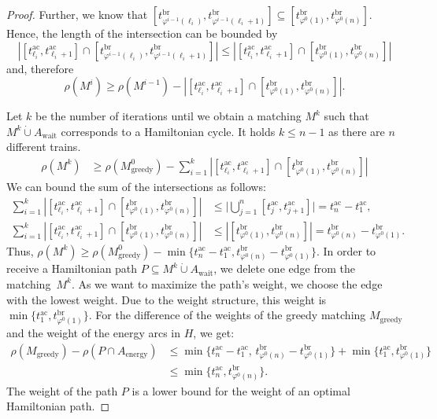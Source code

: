 \documentclass[11pt,a4paper]{article}
\newcommand{\dotcup}{\mathbin{\dot\cup}}
\newcommand{\wait}{\mathrm{wait}}
\newcommand{\energy}{\mathrm{energy}}
\newcommand{\energyact}{M}               %
\newcommand{\ac}{\mathrm{ac}}
\newcommand{\br}{\mathrm{br}}
\newcommand{\w}{\rho} %
\theoremstyle{definition}
\theoremstyle{remark}
\begin{document}
\begin{proof}
	Further, we know that $[t^{\br}_{\varphi^{i-1}(\ell_i)}, t^{\br}_{\varphi^{i-1}(\ell_i+1)} ] \subseteq [t^{\br}_{\varphi^{0}(1)}, t^{\br}_{\varphi^{0}(n)} ]$.
	Hence, the length of the intersection can be bounded by \[| [t^{\ac}_{\ell_i}, t^{\ac}_{\ell_i+1} ] \cap [t^{\br}_{\varphi^{i-1}(\ell_i)}, t^{\br}_{\varphi^{i-1}(\ell_i+1)} ] | \leq | [t^{\ac}_{\ell_i}, t^{\ac}_{\ell_i+1} ] \cap [t^{\br}_{\varphi^{0}(1)}, t^{\br}_{\varphi^{0}(n)} ] | \] and, therefore 
	$$\w(\energyact^{i}) \geq \w(\energyact^{i-1}) - | [t^{\ac}_{\ell_i}, t^{\ac}_{\ell_i+1} ] \cap [t^{\br}_{\varphi^{0}(1)}, t^{\br}_{\varphi^{0}(n)} ] |.$$
	
	Let $k$ be the number of iterations until we obtain a matching $\energyact^k$ such that $\energyact^k \dotcup A_\wait$ corresponds to a Hamiltonian cycle.  It holds $k \leq n - 1$ as there are $n$ different trains.
	\begin{align*}
		\w(\energyact^{k}) &\geq \w(\energyact^{0}_{\text{greedy}}) - \sum_{i=1}^{k} | [t^{\ac}_{\ell_{i}}, t^{\ac}_{\ell_{i}+1} ] \cap [t^{\br}_{\varphi^{0}(1)}, t^{\br}_{\varphi^{0}(n)}] | 
	\end{align*}
    We can bound the sum of the intersections as follows:
	\begin{align*}
		\sum_{i=1}^{k}  | [t^{\ac}_{\ell_i}, t^{\ac}_{\ell_i+1} ] \cap [t^{\br}_{\varphi^{0}(1)}, t^{\br}_{\varphi^{0}(n)} ] | &\leq \biggl\lvert\bigcup_{j=1}^{n} [t^{\ac}_j, t^{\ac}_{j+1} ] \biggr\rvert  = t^{\ac}_n - t^{\ac}_1,\\
		\sum_{i=1}^{k}  | [t^{\ac}_{\ell_i}, t^{\ac}_{\ell_i+1} ] \cap [t^{\br}_{\varphi^0(1)}, t^{\br}_{\varphi^0(n)} ] | &\leq |[t^{\br}_{\varphi^0(1)}, t^{\br}_{\varphi^0(n)} ]| = t^{\br}_{\varphi^{0}(n)} - t^{\br}_{\varphi^{0}(1)}.
  	\end{align*}
	Thus, $\w(\energyact^k) \geq \w(\energyact^{0}_\text{greedy}) - \min\{ t^{\ac}_n - t^{\ac}_1, t^{\br}_{\varphi^{0}(n)} - t^{\br}_{\varphi^{0}(1)} \}$. In order to receive a Hamiltonian path $P \subseteq \energyact^k \dotcup A_\wait$, we delete one edge from the matching~$\energyact^k$. As we want to maximize the path's weight, we choose the edge with the lowest weight. Due to the weight structure, this weight is $\min \{t^{\ac}_1, t^{\br}_{\varphi^{0}(1)} \}$. For the difference of the weights of the greedy matching  $\energyact_{\text{greedy}}$ and the weight of the energy arcs in $H$, we get:
	\begin{align*}
		\w(\energyact_\text{greedy}) - \w(P \cap A_\energy) &\leq  \min\{ t^{\ac}_n - t^{\ac}_1,\, t^{\br}_{\varphi^{0}(n)} - t^{\br}_{\varphi^{0}(1)} \} + \min \{t^{\ac}_1, t^{\br}_{\varphi^{0}(1)} \}\\
		& \leq   \min\{ t^{\ac}_n , t^{\br}_{\varphi^{0}(n)} \}.
	\end{align*}
	The weight of the path $P$ is a lower bound for the weight of an optimal Hamiltonian path.
\end{proof}
\end{document}
